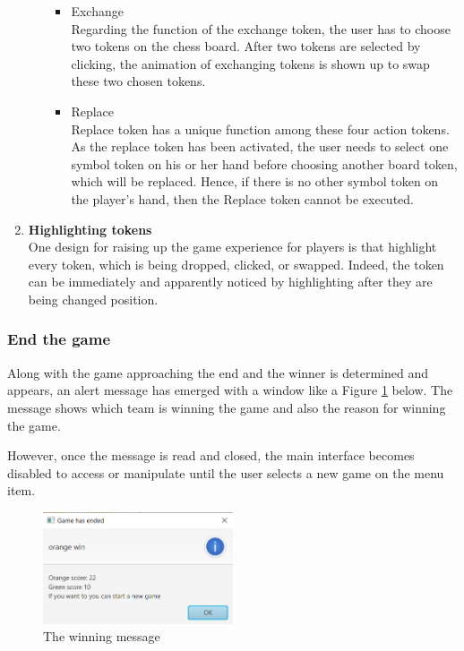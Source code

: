\begin{enumerate}
\begin{itemize}
\begin{itemize}
			\item{Exchange} \\
		    Regarding the function of the exchange token, the user has to choose two tokens on the chess board. After two tokens are selected by clicking, the animation of exchanging tokens is shown up to swap these two chosen tokens.  
			
			\item{Replace} \\
			Replace token has a unique function among these four action tokens. As the replace token has been activated, the user needs to select one symbol token on his or her hand before choosing another board token, which will be replaced.  
			Hence, if there is no other symbol token on the player's hand, then the Replace token cannot be executed.
			
		\end{itemize}
		
		
	\end{itemize}
	
	\item\textbf{Highlighting tokens}\\
	One design for raising up the game experience for players is that highlight every token, which is being dropped, clicked, or swapped. 
	Indeed, the token can be immediately and apparently noticed by highlighting after they are being changed position. 
	
\end{enumerate}

\newpage
\subsubsection{End the game}
Along with the game approaching the end and the winner is determined and appears, an alert message has emerged with a window like a Figure \ref{fig:winnerMessage} below. The message shows which team is winning the game and also the reason for winning the game.  

However, once the message is read and closed, the main interface becomes disabled to access or manipulate until the user selects a new game on the menu item.  

\begin{figure}[h]
	\centering
	\includegraphics[width=0.5\textwidth]{image/winner message}
	\caption{The winning message}
	\label{fig:winnerMessage}
\end{figure}

